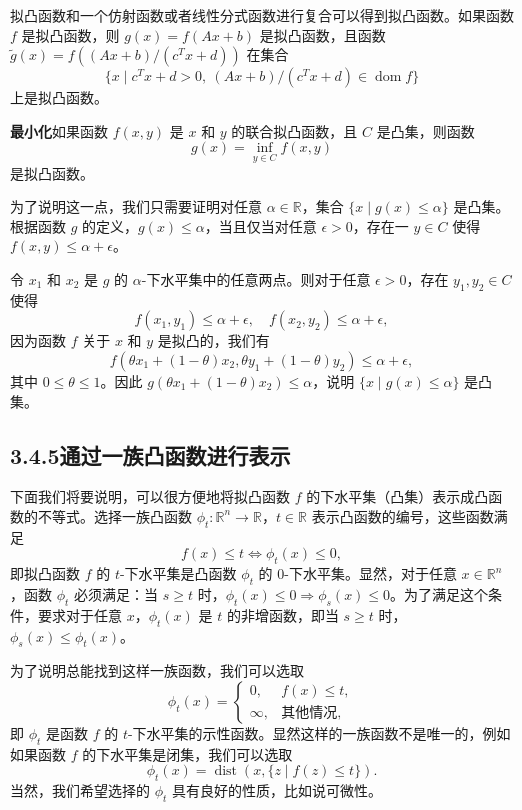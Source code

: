 \documentclass[UTF8, 12pt, fontset=fandol, oneside]{ctexart}
\DeclareMathOperator{\dom}{dom}
\begin{document}
拟凸函数和一个仿射函数或者线性分式函数进行复合可以得到拟凸函数。如果函数 $f$ 是拟凸函数，则 $g(x)=f(Ax+b)$ 是拟凸函数，且函数 $\tilde g(x)=f((Ax+b)/(c^Tx+d))$ 在集合
\[
\{x\mid c^Tx+d>0,\ (Ax+b)/(c^Tx+d)\in\dom f\}
\]
上是拟凸函数。

\noindent\textbf{最小化}\quad 如果函数 $f(x,y)$ 是 $x$ 和 $y$ 的联合拟凸函数，且 $C$ 是凸集，则函数
\[
g(x)=\inf_{y\in C}f(x,y)
\]
是拟凸函数。

为了说明这一点，我们只需要证明对任意 $\alpha\in\mathbb{R}$，集合 $\{x\mid g(x)\leq\alpha\}$ 是凸集。根据函数 $g$ 的定义，$g(x)\leq\alpha$，当且仅当对任意 $\epsilon>0$，存在一 $y\in C$ 使得 $f(x,y)\leq\alpha+\epsilon$。

令 $x_1$ 和 $x_2$ 是 $g$ 的 $\alpha$-下水平集中的任意两点。则对于任意 $\epsilon>0$，存在 $y_1,y_2\in C$ 使得
\[
f(x_1,y_1)\leq\alpha+\epsilon,\quad
f(x_2,y_2)\leq\alpha+\epsilon,
\]
因为函数 $f$ 关于 $x$ 和 $y$ 是拟凸的，我们有
\[
f(\theta x_1+(1-\theta)x_2,\theta y_1+(1-\theta)y_2)\leq\alpha+\epsilon,
\]
其中 $0\leq\theta\leq1$。因此 $g(\theta x_1+(1-\theta)x_2)\leq\alpha$，说明 $\{x\mid g(x)\leq\alpha\}$ 是凸集。

\subsection*{3.4.5\quad 通过一族凸函数进行表示}

下面我们将要说明，可以很方便地将拟凸函数 $f$ 的下水平集（凸集）表示成凸函数的不等式。选择一族凸函数 $\phi_t:\mathbb{R}^n\to\mathbb{R}$，$t\in\mathbb{R}$ 表示凸函数的编号，这些函数满足
\begin{equation}
f(x)\leq t\Longleftrightarrow \phi_t(x)\leq0,
\tag{3.23}
\end{equation}
即拟凸函数 $f$ 的 $t$-下水平集是凸函数 $\phi_t$ 的 $0$-下水平集。显然，对于任意 $x\in\mathbb{R}^n$，函数 $\phi_t$ 必须满足：当 $s\geq t$ 时，$\phi_t(x)\leq0\Longrightarrow\phi_s(x)\leq0$。为了满足这个条件，要求对于任意 $x$，$\phi_t(x)$ 是 $t$ 的非增函数，即当 $s\geq t$ 时，$\phi_s(x)\leq\phi_t(x)$。

为了说明总能找到这样一族函数，我们可以选取
\[
\phi_t(x)=
\begin{cases}
0, & f(x)\leq t,\\
\infty, & \text{其他情况},
\end{cases}
\]
即 $\phi_t$ 是函数 $f$ 的 $t$-下水平集的示性函数。显然这样的一族函数不是唯一的，例如如果函数 $f$ 的下水平集是闭集，我们可以选取
\[
\phi_t(x)=\operatorname{dist}(x,\{z\mid f(z)\leq t\}).
\]
当然，我们希望选择的 $\phi_t$ 具有良好的性质，比如说可微性。
\end{document}
